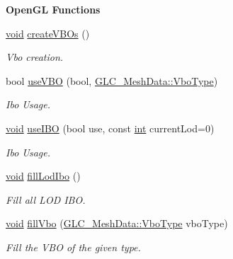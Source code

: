\begin{Indent}{\bf Open\-G\-L Functions}\par
\begin{DoxyCompactItemize}
\item 
\hyperlink{group___u_a_v_objects_plugin_ga444cf2ff3f0ecbe028adce838d373f5c}{void} \hyperlink{class_g_l_c___mesh_data_a3b673b8f122924a63562988ab186f263}{create\-V\-B\-Os} ()
\begin{DoxyCompactList}\small\item\em Vbo creation. \end{DoxyCompactList}\item 
bool \hyperlink{class_g_l_c___mesh_data_a08ea5d2f2bc9a447e1f50ee25c55f2da}{use\-V\-B\-O} (bool, \hyperlink{class_g_l_c___mesh_data_aad6ad4c9ec9e7350c0e62cfcb1a95d48}{G\-L\-C\-\_\-\-Mesh\-Data\-::\-Vbo\-Type})
\begin{DoxyCompactList}\small\item\em Ibo Usage. \end{DoxyCompactList}\item 
\hyperlink{group___u_a_v_objects_plugin_ga444cf2ff3f0ecbe028adce838d373f5c}{void} \hyperlink{class_g_l_c___mesh_data_a197e487ac27378f65e8c676a633cd98f}{use\-I\-B\-O} (bool use, const \hyperlink{ioapi_8h_a787fa3cf048117ba7123753c1e74fcd6}{int} current\-Lod=0)
\begin{DoxyCompactList}\small\item\em Ibo Usage. \end{DoxyCompactList}\item 
\hyperlink{group___u_a_v_objects_plugin_ga444cf2ff3f0ecbe028adce838d373f5c}{void} \hyperlink{class_g_l_c___mesh_data_a4e197e5b4f92e7ee647f2242835e576f}{fill\-Lod\-Ibo} ()
\begin{DoxyCompactList}\small\item\em Fill all L\-O\-D I\-B\-O. \end{DoxyCompactList}\item 
\hyperlink{group___u_a_v_objects_plugin_ga444cf2ff3f0ecbe028adce838d373f5c}{void} \hyperlink{class_g_l_c___mesh_data_ae3baa732c8666f82896dade2c9051336}{fill\-Vbo} (\hyperlink{class_g_l_c___mesh_data_aad6ad4c9ec9e7350c0e62cfcb1a95d48}{G\-L\-C\-\_\-\-Mesh\-Data\-::\-Vbo\-Type} vbo\-Type)
\begin{DoxyCompactList}\small\item\em Fill the V\-B\-O of the given type. \end{DoxyCompactList}\end{DoxyCompactItemize}
\end{Indent}
